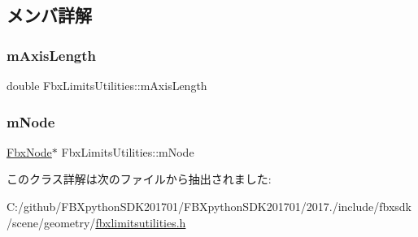 \subsection{メンバ詳解}
\mbox{\label{class_fbx_limits_utilities_adb006b0fb0202573d3401021d860a66f}} 
\subsubsection{\texorpdfstring{m\+Axis\+Length}{mAxisLength}}
{\footnotesize\ttfamily double Fbx\+Limits\+Utilities\+::m\+Axis\+Length}

\mbox{\label{class_fbx_limits_utilities_aa0edad5da0f8d55bf0ada0b8268d7b17}} 
\subsubsection{\texorpdfstring{m\+Node}{mNode}}
{\footnotesize\ttfamily \hyperlink{class_fbx_node}{Fbx\+Node}$\ast$ Fbx\+Limits\+Utilities\+::m\+Node}



このクラス詳解は次のファイルから抽出されました\+:\begin{DoxyCompactItemize}
\item 
C\+:/github/\+F\+B\+Xpython\+S\+D\+K201701/\+F\+B\+Xpython\+S\+D\+K201701/2017./include/fbxsdk/scene/geometry/\hyperlink{fbxlimitsutilities_8h}{fbxlimitsutilities.\+h}\end{DoxyCompactItemize}
